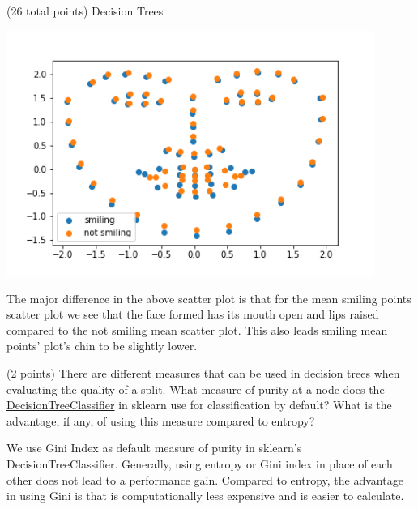 \documentclass[12pt]{article}
\begin{document}
\begin{question}{(26 total points) Decision Trees}
\begin{subquestion}
\begin{answerbox}{35em}
\begin{center}
    \includegraphics[width=0.9\textwidth]{results/smile-no-smile-mean-scatter.png}
\end{center}
The major difference in the above scatter plot is that for the mean smiling points scatter plot we see that the face formed has its mouth open and lips raised compared to the not smiling mean scatter plot. This also leads smiling mean points' plot's chin to be slightly lower.
\end{answerbox}



\end{subquestion}


%
%
\begin{subquestion}{(2 points) 
There are different measures that can be used in decision trees when evaluating the quality of a split. 
What measure of purity at a node does the \href{https://scikit-learn.org/0.19/modules/generated/sklearn.tree.DecisionTreeClassifier.html}{DecisionTreeClassifier} in sklearn use for classification by default? 
What is the advantage, if any, of using this measure compared to entropy? 
}


\begin{answerbox}{10em}
We use Gini Index as default measure of purity in sklearn's DecisionTreeClassifier. Generally, using entropy or Gini index in place of each other does not lead to a performance gain. Compared to entropy, the advantage in using Gini is that is computationally less expensive and is easier to calculate.
\end{answerbox}



\end{subquestion}



\end{question}
\end{document}
